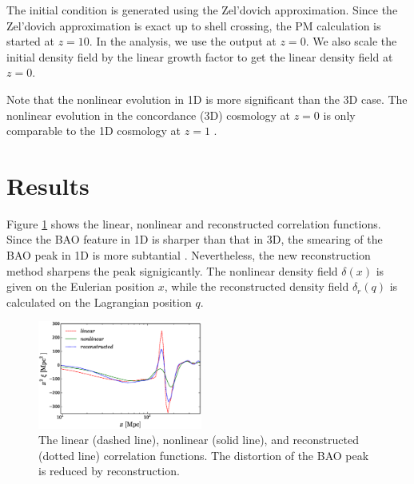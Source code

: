 \documentclass[aps,prd,twocolumn,showpacs,superscriptaddress,groupedaddress,nofootinbib]{revtex4}  %
\begin{document}
The initial condition is generated using the Zel'dovich approximation.
Since the Zel'dovich approximation is exact up to shell crossing, the PM 
calculation is started at $z=10$. In the analysis, we use the output at $z=0$.
We also scale the initial density field by the linear growth factor to get the
linear density field at $z=0$. 

Note that the nonlinear evolution in 1D is more significant than the 3D case.
The nonlinear evolution in the concordance (3D) cosmology at $z=0$ is 
only comparable to the 1D cosmology at $z=1$ \cite{2016matt}.


\section{Results}
\label{res}
Figure \ref{fig:ps} shows the linear, nonlinear and reconstructed correlation
functions.
Since the BAO feature in 1D is sharper than that in 3D, the smearing of the BAO
peak in 1D is more subtantial \cite{2016matt}. 
Nevertheless, the new reconstruction method sharpens the peak signigicantly.
The nonlinear density field $\delta(x)$ is given on the Eulerian position $x$,
while the reconstructed density field $\delta_r(q)$ is calculated on the 
Lagrangian position $q$. 

\begin{figure}[tbp]
\begin{center}
\includegraphics[width=0.48\textwidth]{f1.eps}
\end{center}
\vspace{-0.7cm}
\caption{The linear (dashed line), nonlinear (solid line), and reconstructed 
(dotted line) correlation functions.  
The distortion of the BAO peak is reduced by reconstruction.}
\label{fig:ps}
\end{figure}
\end{document}
